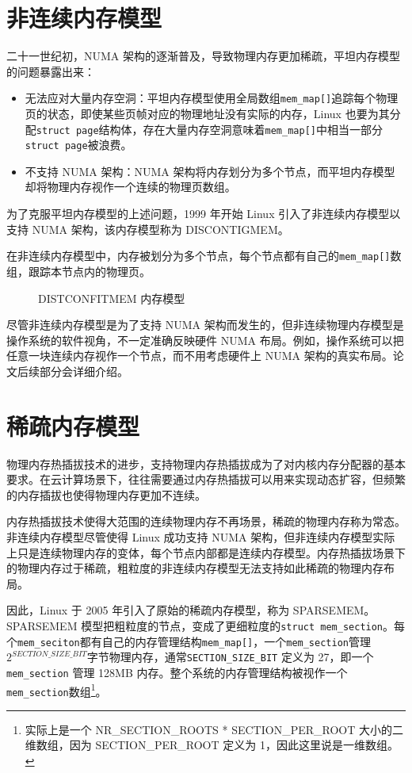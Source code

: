 \documentclass[AutoFakeBold]{LZUThesis}
\begin{document}
\begin{sloppypar}
\section{非连续内存模型}

二十一世纪初，NUMA
架构的逐渐普及，导致物理内存更加稀疏，平坦内存模型的问题暴露出来：

\begin{itemize}
\item
  无法应对大量内存空洞：平坦内存模型使用全局数组\texttt{mem\_map{[}{]}}追踪每个物理页的状态，即使某些页帧对应的物理地址没有实际的内存，Linux
  也要为其分配\texttt{struct\ page}结构体，存在大量内存空洞意味着\texttt{mem\_map{[}{]}}中相当一部分\texttt{struct\ page}被浪费。
\item
  不支持 NUMA 架构：NUMA
  架构将内存划分为多个节点，而平坦内存模型却将物理内存视作一个连续的物理页数组。
\end{itemize}

为了克服平坦内存模型的上述问题，1999 年开始 Linux
引入了非连续内存模型以支持 NUMA 架构，该内存模型称为 DISCONTIGMEM。

在非连续内存模型中，内存被划分为多个节点，每个节点都有自己的\texttt{mem\_map{[}{]}}数组，跟踪本节点内的物理页。

\begin{figure}[htb]
\centering

\caption{DISTCONFITMEM 内存模型}
\end{figure}

尽管非连续内存模型是为了支持 NUMA
架构而发生的，但非连续物理内存模型是操作系统的软件视角，不一定准确反映硬件
NUMA
布局。例如，操作系统可以把任意一块连续内存视作一个节点，而不用考虑硬件上
NUMA 架构的真实布局。论文后续部分会详细介绍。


\section{稀疏内存模型}

物理内存热插拔技术的进步，支持物理内存热插拔成为了对内核内存分配器的基本要求。在云计算场景下，往往需要通过内存热插拔可以用来实现动态扩容，但频繁的内存插拔也使得物理内存更加不连续。

内存热插拔技术使得大范围的连续物理内存不再场景，稀疏的物理内存称为常态。非连续内存模型尽管使得
Linux 成功支持 NUMA
架构，但非连续内存模型实际上只是连续物理内存的变体，每个节点内部都是连续内存模型。内存热插拔场景下的物理内存过于稀疏，粗粒度的非连续内存模型无法支持如此稀疏的物理内存布局。

因此，Linux 于 2005 年引入了原始的稀疏内存模型，称为
SPARSEMEM。SPARSEMEM
模型把粗粒度的节点，变成了更细粒度的\texttt{struct\ mem\_section}。每个\texttt{mem\_seciton}都有自己的内存管理结构\texttt{mem\_map{[}{]}}，一个\texttt{mem\_section}管理\(2^{SECTION\_SIZE\_BIT}\)字节物理内存，通常\texttt{SECTION\_SIZE\_BIT}
定义为 27，即一个\texttt{mem\_section} 管理 128MB
内存。整个系统的内存管理结构被视作一个\texttt{mem\_section}数组\footnote{实际上是一个
  NR\_SECTION\_ROOTS * SECTION\_PER\_ROOT 大小的二维数组，因为
  SECTION\_PER\_ROOT 定义为 1，因此这里说是一维数组。}。


\end{sloppypar}
\end{document}
